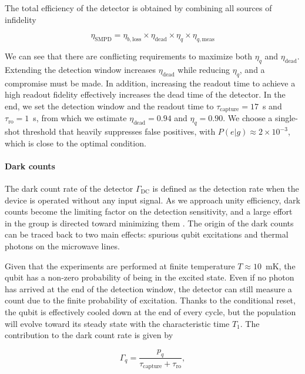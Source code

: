 The total efficiency of the detector is obtained by combining all sources of infidelity

\begin{equation}
    \eta_\text{SMPD} = \eta_{b, \text{loss}} \times \eta_\text{dead} \times \eta_{q} \times \eta_{q, \text{meas}}
\end{equation}

We can see that there are conflicting requirements to maximize both $\eta_{q}$ and $\eta_\text{dead}$. Extending the detection window increases $\eta_\text{dead}$ while reducing $\eta_q$, and a compromise must be made. In addition, increasing the readout time to achieve a high readout fidelity effectively increases the dead time of the detector. In the end, we set the detection window and the readout time to $\tau_\text{capture}=17$~\textmu s and $\tau_\text{ro}=1$~\textmu s, from which we estimate $\eta_\text{dead}=0.94$ and $\eta_{q}=0.90$. We choose a single-shot threshold that heavily suppresses false positives, with $P(e|g)\approx2\times10^{-3}$, which is close to the optimal condition.

\paragraph{Dark counts} 

The dark count rate of the detector $\Gamma_\text{DC}$ is defined as the detection rate when the device is operated without any input signal. As we approach unity efficiency, dark counts become the limiting factor on the detection sensitivity, and a large effort in the group is directed toward minimizing them . The origin of the dark counts can be traced back to two main effects: spurious qubit excitations and thermal photons on the microwave lines.

Given that the experiments are performed at finite temperature $T\approx10$~mK, the qubit has a non-zero probability of being in the excited state. Even if no photon has arrived at the end of the detection window, the detector can still measure a count due to the finite probability of excitation. Thanks to the conditional reset, the qubit is effectively cooled down at the end of every cycle, but the population will evolve toward its steady state with the characteristic time $T_1$. The contribution to the dark count rate is given by

\begin{equation}
    \Gamma_q = \frac{p_q}{ \tau_\text{capture} + \tau_\text{ro}}, 
\end{equation}

